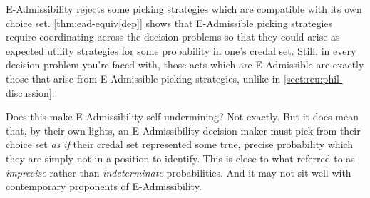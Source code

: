 \documentclass[a4paper]{article}
\newcommand\EU{\mathrm{EU}}
\newcommand{\IB}{\mathbb{B}}
\newcommand{\pb}{b}
\renewcommand{\color}[1]{}
\newenvironment{CCM rewritten}
{\begingroup\color{blue}} %
{\endgroup}              %
\begin{document}
{%

{\color{red} E-Admissibility rejects some picking strategies which are compatible with its own choice set. \cref{thm:ead-equiv[dep]} shows that E-Admissible picking strategies require coordinating across the decision problems so that they could arise as expected utility strategies for some probability in one's credal set. Still, in every decision problem you're faced with, those acts which are E-Admissible are exactly those that arise from E-Admissible picking strategies, unlike in \cref{sect:reu:phil-discussion}.



Does this make E-Admissibility self-undermining? Not exactly. But it does mean that, by their own lights, an E-Admissibility decision-maker must pick from their choice set \textit{as if} their credal set represented some true, precise probability which they are simply not in a position to identify. This is close to what \cite{levi99} referred to as \textit{imprecise} rather than \textit{indeterminate} probabilities. And it may not sit well with contemporary proponents of E-Admissibility.



	
}}
\end{document}
